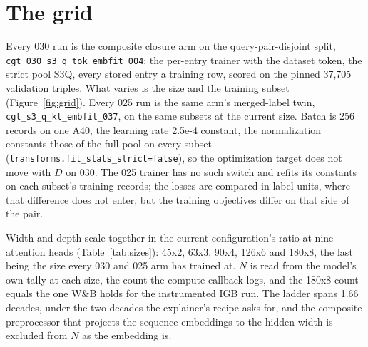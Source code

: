 
\section{The grid}
\label{sec:grid}

Every 030 run is the composite closure arm on the query-pair-disjoint split,
\texttt{cgt\_030\_s3\_q\_tok\_embfit\_004}: the per-entry trainer with the dataset
token, the strict pool S3Q, every stored entry a training row, scored on the
pinned 37,705 validation triples. What varies is the size and the training
subset (Figure~\ref{fig:grid}). Every 025 run is the same arm's merged-label twin,
\texttt{cgt\_s3\_q\_kl\_embfit\_037}, on the same subsets at the current size.
Batch is 256 records on one A40, the learning rate 2.5e-4 constant, the
normalization constants those of the full pool on every subset
(\texttt{transforms.fit\_stats\_strict=false}), so the optimization target does
not move with $D$ on 030. The 025 trainer has no such switch and refits its
constants on each subset's training records; the losses are compared in label
units, where that difference does not enter, but the training objectives differ
on that side of the pair.


Width and depth scale together in the current configuration's ratio at nine
attention heads (Table~\ref{tab:sizes}): 45x2, 63x3, 90x4, 126x6 and 180x8, the
last being the size every 030 and 025 arm has trained at. $N$ is read from the
model's own tally at each size, the count the compute callback logs, and the
180x8 count equals the one W\&B holds for the instrumented IGB run. The ladder
spans 1.66 decades, under the two decades the explainer's recipe asks for, and
the composite preprocessor that projects the sequence embeddings to the hidden
width is excluded from $N$ as the embedding is.

